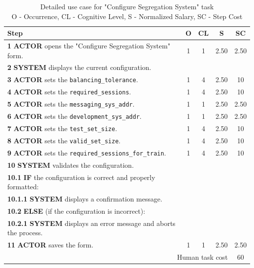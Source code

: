\begin{table}[H]
    \centering
    \begin{tabularx}{\textwidth}{|X|c|c|c|c|}
    
    \hline
    \textbf{Step} & \textbf{O} & \textbf{CL} & \textbf{S} & \textbf{SC} \\
    \hline
    \textbf{1} \textbf{ACTOR} opens the "Configure Segregation System" form. & 1 & 1 & 2.50 & 2.50 \\
    \hline
    \textbf{2} \textbf{SYSTEM} displays the current configuration.& & & & \\ 
    \hline
    \textbf{3} \textbf{ACTOR} sets the \texttt{balancing\_tolerance}.& 1 & 4 & 2.50 & 10 \\
    \hline
    \textbf{4} \textbf{ACTOR} sets the \texttt{required\_sessions}. & 1 & 4 & 2.50 & 10 \\
    \hline
    \textbf{5} \textbf{ACTOR} sets the \texttt{messaging\_sys\_addr}.& 1 & 1 & 2.50 & 2.50 \\ 
    \hline
    \textbf{6} \textbf{ACTOR} sets the \texttt{development\_sys\_addr}.& 1 & 1 & 2.50 & 2.50 \\ 
    \hline
    \textbf{7} \textbf{ACTOR} sets the \texttt{test\_set\_size}.& 1 & 4 & 2.50 & 10 \\ 
    \hline
    \textbf{8} \textbf{ACTOR} sets the \texttt{valid\_set\_size}.& 1 & 4 & 2.50 & 10 \\ 
    \hline
    \textbf{9} \textbf{ACTOR} sets the \texttt{required\_sessions\_for\_train}.& 1 & 4 & 2.50 & 10 \\ 
    \hline
    \textbf{10} \textbf{SYSTEM} validates the configuration.& & & & \\
    \hline
    \textbf{10.1} \textbf{IF} the configuration is correct and properly formatted:& & & & \\ 
    \hline
    \textbf{10.1.1} \textbf{SYSTEM} displays a confirmation message.& & & & \\ 
    \hline
    \textbf{10.2} \textbf{ELSE} (if the configuration is incorrect):& & & & \\
    \hline
    \textbf{10.2.1} \textbf{SYSTEM} displays an error message and aborts the process.& & & & \\
    \hline
    \textbf{11} \textbf{ACTOR} saves the form.& 1 & 1 & 2.50 & 2.50 \\
    \hline
    \multicolumn{4}{|r|}{Human task cost} & 60 \\
    \hline
    \end{tabularx}
    \caption{Detailed use case for "Configure Segregation System" task\\ 
    O - Occurrence, CL - Cognitive Level, S - Normalized Salary, SC - Step Cost}
    \label{table:configure_segregation_system}
    \end{table}

